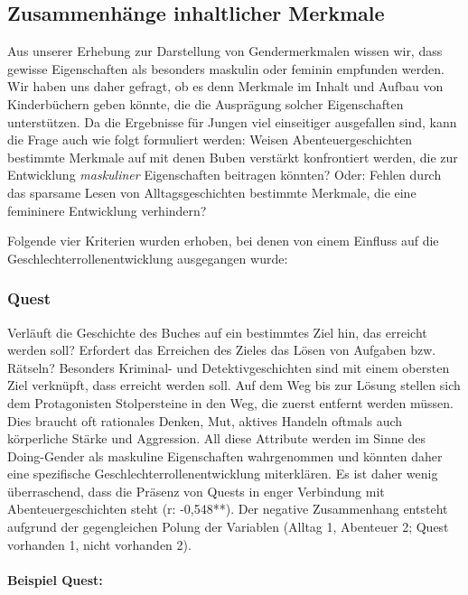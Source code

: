 \subsection{Zusammenhänge inhaltlicher Merkmale}

Aus unserer Erhebung zur Darstellung von Gendermerkmalen wissen wir,
dass gewisse Eigenschaften als besonders maskulin oder feminin empfunden
werden. Wir haben uns daher gefragt, ob es denn Merkmale im Inhalt und
Aufbau von Kinderbüchern geben könnte, die die Ausprägung solcher
Eigenschaften unterstützen. Da die Ergebnisse für Jungen viel
einseitiger ausgefallen sind, kann die Frage auch wie folgt formuliert
werden: Weisen Abenteuergeschichten bestimmte Merkmale auf mit denen
Buben verstärkt konfrontiert werden, die zur Entwicklung
\emph{maskuliner} Eigenschaften beitragen könnten? Oder: Fehlen durch
das sparsame Lesen von Alltagsgeschichten bestimmte Merkmale, die eine
femininere Entwicklung verhindern?

Folgende vier Kriterien wurden erhoben, bei denen von einem Einfluss auf
die Geschlechterrollenentwicklung ausgegangen wurde:

\subsubsection{Quest}

Verläuft die Geschichte des Buches auf ein bestimmtes Ziel hin, das
erreicht werden soll? Erfordert das Erreichen des Zieles das Lösen von
Aufgaben bzw. Rätseln? Besonders Kriminal- und Detektivgeschichten sind
mit einem obersten Ziel verknüpft, dass erreicht werden soll. Auf dem
Weg bis zur Lösung stellen sich dem Protagonisten Stolpersteine in den
Weg, die zuerst entfernt werden müssen. Dies braucht oft rationales
Denken, Mut, aktives Handeln oftmals auch körperliche Stärke und
Aggression. All diese Attribute werden im Sinne des Doing-Gender als
maskuline Eigenschaften wahrgenommen und könnten daher eine spezifische
Geschlechterrollenentwicklung miterklären. Es ist daher wenig
überraschend, dass die Präsenz von Quests in enger Verbindung mit
Abenteuergeschichten steht (r: -0,548**). Der negative Zusammenhang
entsteht aufgrund der gegengleichen Polung der Variablen (Alltag 1,
Abenteuer 2; Quest vorhanden 1, nicht vorhanden 2).

\paragraph{Beispiel Quest:}

